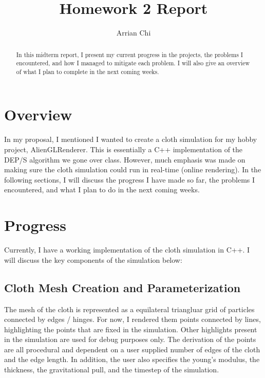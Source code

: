 \documentclass[letterpaper, 10 pt, conference]{ieeeconf}  %
\title{\LARGE \bf
Homework 2 Report
}
\author{Arrian Chi%
}
\begin{document}


\maketitle
\thispagestyle{empty}
\pagestyle{empty}



\begin{abstract}

        In this midterm report, I present my current progress in the projects, the problems I encountered, and how I managed to mitigate each problem. I will also give an overview of what I plan to complete in the next coming weeks.

\end{abstract}
\section{Overview}

In my proposal, I mentioned I wanted to create a cloth simulation for my hobby project, AlienGLRenderer. This is essentially a C++ implementation of the DEP/S algorithm we gone over class. However, much emphasis was made on making sure the cloth simulation could run in real-time (online rendering). In the following sections, I will discuss the progress I have made so far, the problems I encountered, and what I plan to do in the next coming weeks.

\section{Progress}
Currently, I have a working implementation of the cloth simulation in C++. I will discuss the key components of the simulation below:

\subsection{Cloth Mesh Creation and Parameterization}
The mesh of the cloth is represented as a equilateral triangluar grid of particles connected by edges / hinges. For now, I rendered them points connected by lines, highlighting the points that are fixed in the simulation. Other highlights present in the simulation are used for debug purposes only. The derivation of the points are all procedural and dependent on a user supplied number of edges of the cloth and the edge length. In addition, the user also specifies the young's modulus, the thickness, the gravitational pull, and the timestep of the simulation.
\end{document}

